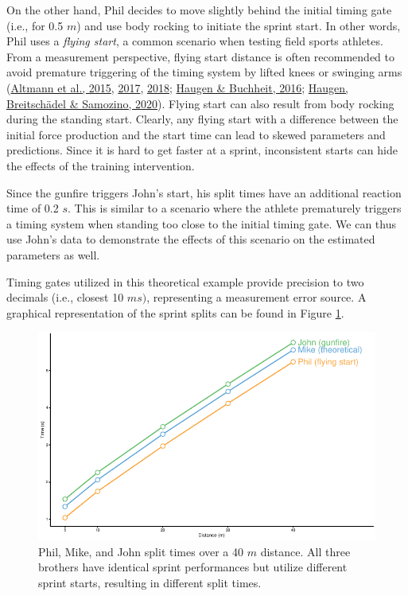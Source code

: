 \documentclass[fleqn,10pt]{wlpeerj} %
\begin{document}
On the other hand, Phil decides to move slightly behind the initial timing gate (i.e., for 0.5 \(m\)) and use body rocking to initiate the sprint start. In other words, Phil uses a \emph{flying start}, a common scenario when testing field sports athletes. From a measurement perspective, flying start distance is often recommended to avoid premature triggering of the timing system by lifted knees or swinging arms (\protect\hyperlink{ref-altmannDifferentStartingDistances2015}{Altmann et al., 2015}, \protect\hyperlink{ref-altmannValiditySingleBeamTiming2017}{2017}, \protect\hyperlink{ref-altmannAccuracySingleBeam2018}{2018}; \protect\hyperlink{ref-haugenSprintRunningPerformance2016}{Haugen \& Buchheit, 2016}; \protect\hyperlink{ref-haugenPowerForceVelocityProfilingSprinting2020}{Haugen, Breitschädel \& Samozino, 2020}). Flying start can also result from body rocking during the standing start. Clearly, any flying start with a difference between the initial force production and the start time can lead to skewed parameters and predictions. Since it is hard to get faster at a sprint, inconsistent starts can hide the effects of the training intervention.

Since the gunfire triggers John's start, his split times have an additional reaction time of 0.2 \(s\). This is similar to a scenario where the athlete prematurely triggers a timing system when standing too close to the initial timing gate. We can thus use John's data to demonstrate the effects of this scenario on the estimated parameters as well.

Timing gates utilized in this theoretical example provide precision to two decimals (i.e., closest 10 \(ms)\), representing a measurement error source. A graphical representation of the sprint splits can be found in Figure \ref{fig:mike-phil-john-split-times}.



\begin{figure}

{\centering \includegraphics[width=0.9\linewidth]{shorts-simulation-paper_files/figure-latex/mike-phil-john-split-times-1} 

}

\caption{Phil, Mike, and John split times over a 40 \(m\) distance. All three brothers have identical sprint performances but utilize different sprint starts, resulting in different split times.}\label{fig:mike-phil-john-split-times}
\end{figure}
\end{document}
